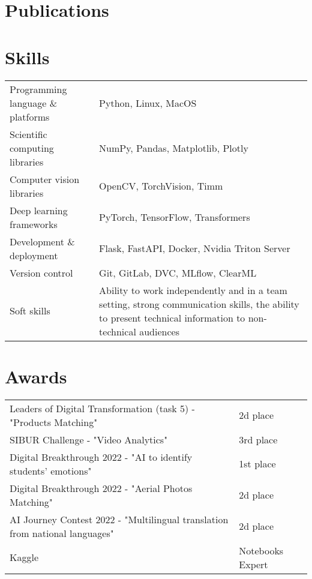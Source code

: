 \documentclass[a4paper,12pt]{article}
\begin{document}
\section{Publications}
\begin{refsection}
\nocite{*}
\printbibliography[heading=none]
\end{refsection}


\section{Skills}
\begin{tabularx}{\linewidth}{@{}l X@{}}
Programming language \& platforms &  \normalsize{Python, Linux, MacOS}\\
Scientific computing libraries &  \normalsize{NumPy, Pandas, Matplotlib, Plotly}\\  
Computer vision libraries &  \normalsize{OpenCV, TorchVision, Timm}\\  
Deep learning frameworks &  \normalsize{PyTorch, TensorFlow, Transformers}\\  
Development \& deployment &  \normalsize{Flask, FastAPI, Docker, Nvidia Triton Server}\\  
Version control &  \normalsize{Git, GitLab, DVC, MLflow, ClearML}\\ 
Soft skills & \normalsize{Ability to work independently and in a team setting, strong communication skills, the ability to present technical information to non-technical audiences}
\end{tabularx}

\section{Awards}
\begin{tabularx}{\linewidth}{@{}l X@{}}
Leaders of Digital Transformation (task 5) - "Products Matching" &  \normalsize{2d place}\\
SIBUR Challenge - "Video Analytics" &  \normalsize{3rd place}\\
Digital Breakthrough 2022 - "AI to identify students' emotions" &  \normalsize{1st place}\\
Digital Breakthrough 2022 - "Aerial Photos Matching" &  \normalsize{2d place }\\
AI Journey Contest 2022 - "Multilingual translation from national languages" & \normalsize{2d place} \\
Kaggle &  \normalsize{Notebooks Expert}
\end{tabularx}


\vfill
\end{document}
